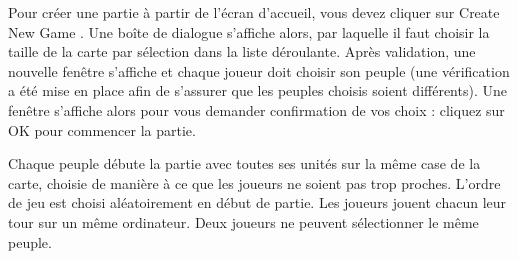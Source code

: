 Pour créer une partie à partir de l'écran d'accueil, vous devez cliquer sur \og Create New Game \fg{}. Une boîte de dialogue s'affiche alors, par laquelle il faut choisir la taille de la carte par sélection dans la liste déroulante. Après validation, une nouvelle fenêtre s'affiche et chaque joueur doit choisir son peuple (une vérification a été mise en place afin de s'assurer que les peuples choisis soient différents). Une fenêtre s'affiche alors pour vous demander confirmation de vos choix : cliquez sur OK pour commencer la partie. 


Chaque peuple débute la partie avec toutes ses unités sur la même case de la carte, choisie de manière à ce que les joueurs ne soient pas trop proches. L’ordre de jeu est choisi aléatoirement en début de partie. Les joueurs jouent chacun leur tour sur un même ordinateur. Deux joueurs ne peuvent sélectionner le même peuple.
